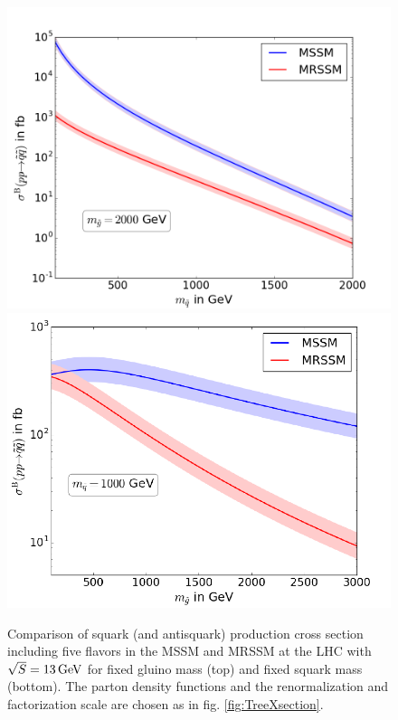 \begin{figure}[!htpb]
\begin{center}
\includegraphics[scale=.5]{figures/MSSM+MRSSM_msg=2000}
\includegraphics[scale=.5]{figures/MSSM+MRSSM_msq=1000}
\caption{Comparison of squark (and antisquark) production cross section including five flavors in the MSSM and MRSSM at the LHC with $\sqrt{S} = \unit[13]{GeV}$ for fixed gluino mass (top) and fixed squark mass (bottom). The parton density functions and the renormalization and factorization scale are chosen as in fig. \ref{fig:TreeXsection}.}\label{fig:TreeXsection_fixed_m}
\end{center}
\end{figure}

